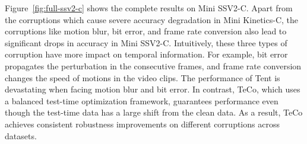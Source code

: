 \documentclass{article} %
\begin{document}
Figure~\ref{fig:full-ssv2-c} shows the complete results on Mini SSV2-C. 
Apart from the corruptions which cause severe accuracy degradation in Mini Kinetics-C, the corruptions like motion blur, bit error, and frame rate conversion also lead to significant drops in accuracy in Mini SSV2-C. 
Intuitively, these three types of corruption have more impact on temporal information. 
For example, bit error propagates the perturbation in the consecutive frames, and frame rate conversion changes the speed of motions in the video clips. 
The performance of Tent is devastating when facing motion blur and bit error. 
In contrast, TeCo, which uses a balanced test-time optimization framework, guarantees performance even though the test-time data has a large shift from the clean data. 
As a result, TeCo achieves consistent robustness improvements on different corruptions across datasets.
\end{document}
